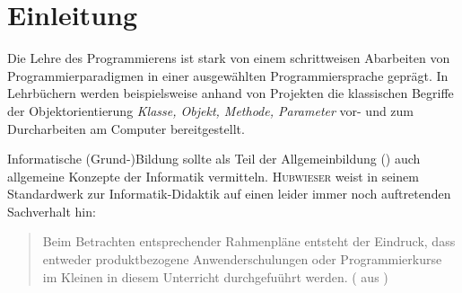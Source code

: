\documentclass[paper=a4, DIV=13, BCOR=12mm, twoside=on, onecolumn=on, open = any, titlepage =on, parskip =half-, headsepline = on, footsepline = on, chapterprefix = on, sectionprefix = on, appendixprefix = off, fontsize = 11pt, numbers = noenddot, abstract = off]{scrreprt}
\begin{document}
\newpage
\thispagestyle{plain}




\thispagestyle{empty}
\newpage
\thispagestyle{empty}

%
%
{}
\newcommand{\hsp}{\hspace{20pt}}
\titleformat{\chapter}[hang]{\Large\bfseries}{\thechapter\hsp\textcolor{gray75}{|}\hsp}{0pt}{\Large\bfseries}

\tableofcontents
\cleardoublepage
{}
\par \singlespacing
\renewcommand*{\dictumwidth}{.6667\textwidth}
\chapter{Einleitung}
\label{sec:einleitung}
\onehalfspacing


Die Lehre des Programmierens ist stark von einem schrittweisen Abarbeiten von Programmierparadigmen in einer ausgewählten Programmiersprache geprägt. In Lehrbüchern werden beispielsweise anhand von Projekten die klassischen Begriffe der Objektorientierung \emph{Klasse, Objekt, Methode, Parameter} vor- und zum Durcharbeiten am Computer bereitgestellt.

Informatische (Grund-)Bildung sollte als Teil der Allgemeinbildung () auch allgemeine Konzepte der Informatik vermitteln. \textsc{Hubwieser} weist in seinem Standardwerk zur Informatik-Didaktik auf einen leider immer noch auftretenden Sachverhalt hin:
\begin{quote}
Beim Betrachten entsprechender Rahmenpläne entsteht der Eindruck, dass entweder produktbezogene Anwenderschulungen oder Programmierkurse im Kleinen in diesem Unterricht durchgefuührt werden. (\cite[S.40]{hubwieser:07} aus \cite{koerber:93})
\end{quote}


\newpage
\par\singlespacing
\end{document}
